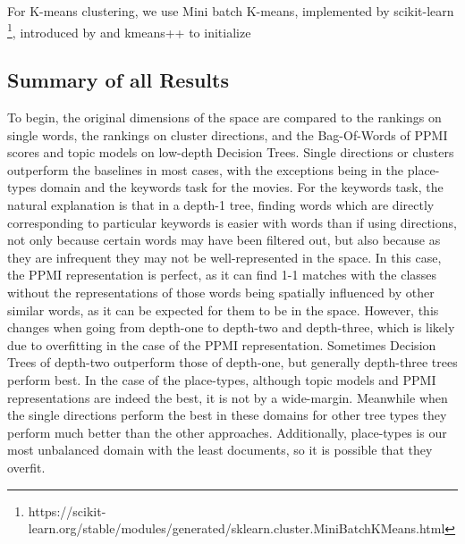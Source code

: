 For K-means clustering, we use Mini batch K-means, implemented by scikit-learn \footnote{https://scikit-learn.org/stable/modules/generated/sklearn.cluster.MiniBatchKMeans.html}, introduced by \cite{Sculley2010} and kmeans++ to initialize \cite{Arthur}

\subsection{Summary of all Results}

To begin, the original dimensions of the space are compared to the rankings on single words, the rankings on cluster directions, and the Bag-Of-Words of PPMI scores and topic models on low-depth Decision Trees. Single directions or clusters outperform the baselines in most cases, with the exceptions being in the place-types domain and the keywords task for the movies. For the keywords task, the natural explanation is that in a depth-1 tree, finding words which are directly corresponding to particular keywords is easier with words than if using directions, not only because certain words may have been filtered out, but also because as they are infrequent they may not be well-represented in the space. In this case, the PPMI representation is perfect, as it can find 1-1 matches with the classes without the representations of those words being spatially influenced by other similar words, as it can be expected for them to be in the space. However, this changes when going from depth-one to depth-two and depth-three, which is likely  due to overfitting in the case of the PPMI representation. Sometimes Decision Trees of depth-two outperform those of depth-one, but generally depth-three trees perform best.  In the case of the place-types, although topic models and PPMI representations are indeed the best, it is not by a wide-margin. Meanwhile when the single directions perform the best in these domains for other tree types they perform much better than the other approaches. Additionally, place-types is our most unbalanced domain with the least documents, so it is possible that they overfit. 




